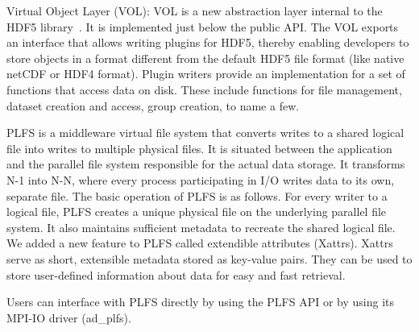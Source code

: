 
Virtual Object Layer (VOL):
VOL is a new abstraction layer internal to the HDF5 library~\cite{vol}. It is implemented just below the public API. The VOL exports an interface that allows writing plugins for HDF5, thereby enabling developers to store objects in a format different from the default HDF5 file format (like native netCDF or HDF4 format). Plugin writers provide an implementation for a set of functions that access data on disk. These include functions for file management, dataset creation and access, group creation, to name a few.

PLFS is a middleware virtual file system that converts writes to a shared logical file into writes to multiple physical files. 
It is situated between the application and the parallel file system responsible for the actual data storage. 
It transforms N-1 into N-N, where every process participating in I/O writes data to its own, separate file. 
The basic operation of PLFS is as follows. For every writer to a logical file, PLFS creates a unique physical file on the underlying parallel file system. 
It also maintains sufficient metadata to recreate the shared logical file. 
We added a new feature to PLFS called extendible attributes (Xattrs). Xattrs serve as short, extensible metadata stored as key-value pairs.
They can be used to store user-defined information about data for easy and fast retrieval. 

Users can interface with PLFS directly by using the PLFS API or by using its MPI-IO driver (ad\_plfs).  




